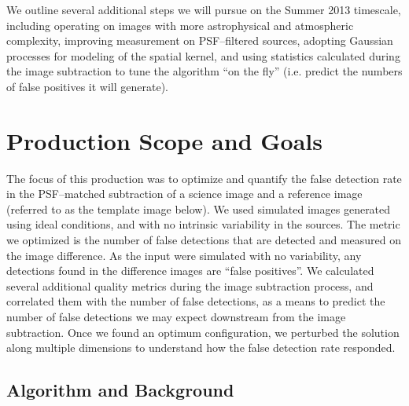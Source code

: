 \documentclass[prd, nofootinbib, floatfix, 11pt,tightenlines,times]{article}
\begin{document}
We outline several additional steps we will pursue on the Summer 2013
timescale, including operating on images with more astrophysical and
atmospheric complexity, improving measurement on PSF--filtered
sources, adopting Gaussian processes for modeling of the spatial
kernel, and using statistics calculated during the image subtraction
to tune the algorithm ``on the fly'' (i.e. predict the numbers of
false positives it will generate).



\clearpage
\tableofcontents
\clearpage

\section{Production Scope and Goals}

The focus of this production was to optimize and quantify the false
detection rate in the PSF--matched subtraction of a science image and
a reference image (referred to as the template image below).  We used
simulated images generated using ideal conditions, and with no
intrinsic variability in the sources.  The metric we optimized is the
number of false detections that are detected and measured on the image
difference.  As the input were simulated with no variability, any
detections found in the difference images are ``false positives''.  We
calculated several additional quality metrics during the image
subtraction process, and correlated them with the number of false
detections, as a means to predict the number of false detections we
may expect downstream from the image subtraction.  Once we found an
optimum configuration, we perturbed the solution along multiple
dimensions to understand how the false detection rate responded.  

\subsection{Algorithm and Background}
\end{document}
